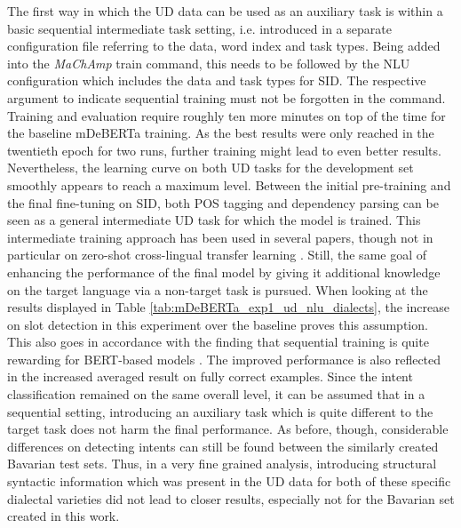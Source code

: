 \documentclass[11pt,a4paper,twoside,openright]{scrbook}
\begin{document}
The first way in which the UD data can be used as an auxiliary task is within a basic sequential intermediate task setting, i.e. introduced in a separate configuration file referring to the data, word index and task types. Being added into the \textit{MaChAmp} train command, this needs to be followed by the NLU configuration which includes the data and task types for SID. The respective argument to indicate sequential training must not be forgotten in the command. Training and evaluation require roughly ten more minutes on top of the time for the baseline mDeBERTa training. As the best results were only reached in the twentieth epoch for two runs, further training might lead to even better results. Nevertheless, the learning curve on both UD tasks for the development set smoothly appears to reach a maximum level. Between the initial pre-training and the final fine-tuning on SID, both POS tagging and dependency parsing can be seen as a general intermediate UD task for which the model is trained. This intermediate training approach has been used in several papers, though not in particular on zero-shot cross-lingual transfer learning  \citep{pruksachatkun-etal-2020-intermediate, phang-etal-2020-english}. Still, the same goal of enhancing the performance of the final model by giving it additional knowledge on the target language via a non-target task is pursued. When looking at the results displayed in Table \ref{tab:mDeBERTa_exp1_ud_nlu_dialects}, the increase on slot detection in this experiment over the baseline proves this assumption. This also goes in accordance with the finding that sequential training is quite rewarding for BERT-based models \citep{clark-etal-2019-boolq}. The improved performance is also reflected in the increased averaged result on fully correct examples. Since the intent classification remained on the same overall level, it can be assumed that in a sequential setting, introducing an auxiliary task which is quite different to the target task does not harm the final performance. As before, though, considerable differences on detecting intents can still be found between the similarly created Bavarian test sets. Thus, in a very fine grained analysis, introducing structural syntactic information which was present in the UD data for both of these specific dialectal varieties did not lead to closer results, especially not for the Bavarian set created in this work.
\end{document}
